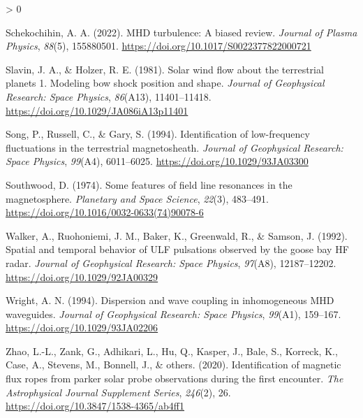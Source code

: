 \documentclass[
  notoc %
]{tufte-book}
\newlength{\cslhangindent}
\newenvironment{CSLReferences}[2] %
 {%
  \setlength{\parindent}{0pt}
  \ifodd #1 \everypar{\setlength{\hangindent}{\cslhangindent}}\ignorespaces\fi
  \ifnum #2 > 0
  \setlength{\parskip}{#2\baselineskip}
  \fi
 }%
 {}
\begin{document}
\begin{CSLReferences}{1}{0}
\leavevmode\hypertarget{ref-schekochihin_2022}{}%
Schekochihin, A. A. (2022). MHD turbulence: A biased review.
\emph{Journal of Plasma Physics}, \emph{88}(5), 155880501.
\url{https://doi.org/10.1017/S0022377822000721}

\leavevmode\hypertarget{ref-slavin1981solar}{}%
Slavin, J. A., \& Holzer, R. E. (1981). Solar wind flow about the
terrestrial planets 1. Modeling bow shock position and shape.
\emph{Journal of Geophysical Research: Space Physics}, \emph{86}(A13),
11401--11418. \url{https://doi.org/10.1029/JA086iA13p11401}

\leavevmode\hypertarget{ref-song1994identification}{}%
Song, P., Russell, C., \& Gary, S. (1994). Identification of
low-frequency fluctuations in the terrestrial magnetosheath.
\emph{Journal of Geophysical Research: Space Physics}, \emph{99}(A4),
6011--6025. \url{https://doi.org/10.1029/93JA03300}

\leavevmode\hypertarget{ref-southwood1974some}{}%
Southwood, D. (1974). Some features of field line resonances in the
magnetosphere. \emph{Planetary and Space Science}, \emph{22}(3),
483--491. \url{https://doi.org/10.1016/0032-0633(74)90078-6}

\leavevmode\hypertarget{ref-walker1992spatial}{}%
Walker, A., Ruohoniemi, J. M., Baker, K., Greenwald, R., \& Samson, J.
(1992). Spatial and temporal behavior of ULF pulsations observed by the
goose bay HF radar. \emph{Journal of Geophysical Research: Space
Physics}, \emph{97}(A8), 12187--12202.
\url{https://doi.org/10.1029/92JA00329}

\leavevmode\hypertarget{ref-wright1994}{}%
Wright, A. N. (1994). Dispersion and wave coupling in inhomogeneous MHD
waveguides. \emph{Journal of Geophysical Research: Space Physics},
\emph{99}(A1), 159--167. \url{https://doi.org/10.1029/93JA02206}

\leavevmode\hypertarget{ref-zhao2020identification}{}%
Zhao, L.-L., Zank, G., Adhikari, L., Hu, Q., Kasper, J., Bale, S.,
Korreck, K., Case, A., Stevens, M., Bonnell, J., \& others. (2020).
Identification of magnetic flux ropes from parker solar probe
observations during the first encounter. \emph{The Astrophysical Journal
Supplement Series}, \emph{246}(2), 26.
\url{https://doi.org/10.3847/1538-4365/ab4ff1}

\end{CSLReferences}

\backmatter
\end{document}
